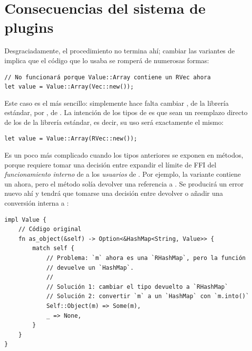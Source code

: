 \section{Consecuencias del sistema de plugins}

Desgraciadamente, el procedimiento no termina ahí; cambiar las variantes de
 implica que el código que lo usaba se romperá de numerosas formas:

\begin{verbatim}
// No funcionará porque Value::Array contiene un RVec ahora
let value = Value::Array(Vec::new());
\end{verbatim}

Este caso es el más sencillo: simplemente hace falta cambiar , de la
librería estándar, por , de \abistable. La intención de los tipos de
\abistable es que sean un reemplazo directo de los de la librería estándar, es
decir, su uso será exactamente el mismo:

\begin{verbatim}
let value = Value::Array(RVec::new());
\end{verbatim}

Es un poco más complicado cuando los tipos anteriores se exponen en métodos,
porque requiere tomar una decisión entre expandir el límite de FFI del
\emph{funcionamiento interno} de  a los \emph{usuarios} de
. Por ejemplo, la variante  contiene un
 ahora, pero el método  solía devolver una
referencia a . Se producirá un error nuevo ahí y tendrá que
tomarse una decisión entre devolver  o añadir una conversión
interna a :

\begin{verbatim}
impl Value {
    // Código original
    fn as_object(&self) -> Option<&HashMap<String, Value>> {
        match self {
            // Problema: `m` ahora es una `RHashMap`, pero la función
            // devuelve un `HashMap`.
            //
            // Solución 1: cambiar el tipo devuelto a `RHashMap`
            // Solución 2: convertir `m` a un `HashMap` con `m.into()`
            Self::Object(m) => Some(m),
            _ => None,
        }
    }
}
\end{verbatim}

